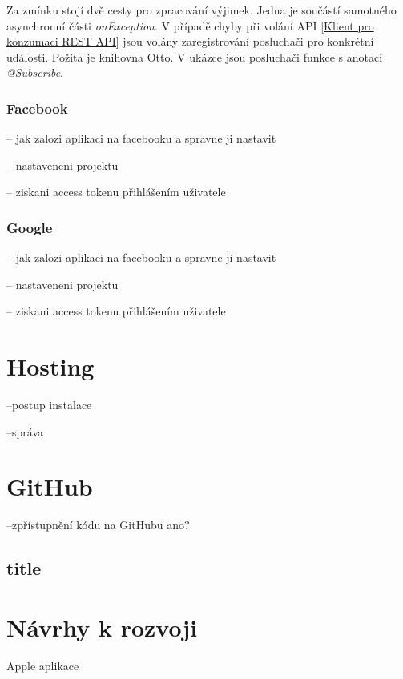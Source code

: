 \documentclass[thesis=B,czech]{FITthesis}[2012/06/26]
\begin{document}
Za zmínku stojí dvě cesty pro zpracování výjimek. Jedna je součástí samotného asynchronní části \textit{onException}. V případě chyby při volání API \ref{Klient pro konzumaci REST API} jsou volány zaregistrování posluchači pro konkrétní události. Požita je knihovna Otto\cite{android_otto}. V ukázce jsou posluchači funkce s anotaci \textit{@Subscribe}.



\subsubsection{Facebook}
\label{realization:android_facebook}
-- jak zalozi aplikaci na facebooku a spravne ji nastavit

-- nastaveneni projektu

-- ziskani access tokenu přihlášením uživatele 

\subsubsection{Google}
\label{realization:android_google}

-- jak zalozi aplikaci na facebooku a spravne ji nastavit

-- nastaveneni projektu

-- ziskani access tokenu přihlášením uživatele 

\section{Hosting}

--postup instalace 

--správa

\section{GitHub}

--zpřístupnění kódu na GitHubu ano?



\subsection{title}

\section{Návrhy k rozvoji}
Apple aplikace 
\end{document}

